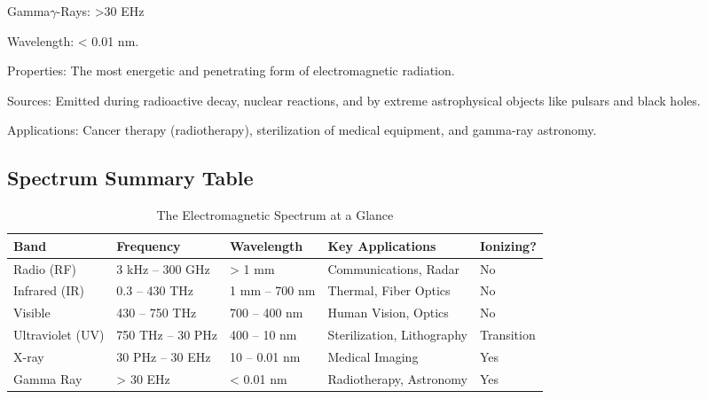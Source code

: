 \begin{spectrumband}{Gamma}{$\gamma$-Rays: >30 EHz}
    \item[Wavelength:] < 0.01 nm.
    \item[Properties:] The most energetic and penetrating form of electromagnetic radiation.
    \item[Sources:] Emitted during radioactive decay, nuclear reactions, and by extreme astrophysical objects like pulsars and black holes.
    \item[Applications:] Cancer therapy (radiotherapy), sterilization of medical equipment, and gamma-ray astronomy.
\end{spectrumband}

\subsection{Spectrum Summary Table}
\begin{table}[H]
    \centering
    \caption{The Electromagnetic Spectrum at a Glance}
    \label{tab:spectrum-summary}
    \begin{tabular}{@{}lllll@{}}
        \toprule
        \tableheaderfont Band & \tableheaderfont Frequency & \tableheaderfont Wavelength & \tableheaderfont Key Applications & \tableheaderfont Ionizing? \\
        \midrule
        Radio (RF) & 3 kHz -- 300 GHz & > 1 mm & Communications, Radar & No \\
        Infrared (IR) & 0.3 -- 430 THz & 1 mm -- 700 nm & Thermal, Fiber Optics & No \\
        Visible & 430 -- 750 THz & 700 -- 400 nm & Human Vision, Optics & No \\
        Ultraviolet (UV) & 750 THz -- 30 PHz & 400 -- 10 nm & Sterilization, Lithography & Transition \\
        X-ray & 30 PHz -- 30 EHz & 10 -- 0.01 nm & Medical Imaging & Yes \\
        Gamma Ray & > 30 EHz & < 0.01 nm & Radiotherapy, Astronomy & Yes \\
        \bottomrule
    \end{tabular}
\end{table}

